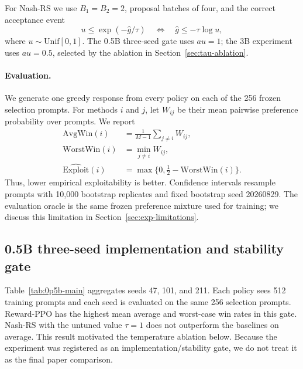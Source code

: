 For Nash-RS we use $B_1=B_2=2$, proposal batches of four, and the correct
acceptance event
\begin{equation}
  u \leq \exp\!\left(-\widehat g/\tau\right)
  \quad\Longleftrightarrow\quad
  \widehat g \leq -\tau\log u,
\end{equation}
where $u\sim\mathrm{Unif}[0,1]$.  The 0.5B three-seed gate uses $	au=1$;
the 3B experiment uses $	au=0.5$, selected by the ablation in
Section~\ref{sec:tau-ablation}.

\paragraph{Evaluation.}
We generate one greedy response from every policy on each of the 256 frozen
selection prompts.  For methods $i$ and $j$, let
$W_{ij}$ be their mean pairwise preference probability over prompts.  We report
\begin{align}
  \mathrm{AvgWin}(i) &= \frac{1}{M-1}\sum_{j\ne i} W_{ij}, \\
  \mathrm{WorstWin}(i) &= \min_{j\ne i} W_{ij}, \\
  \widehat{\mathrm{Exploit}}(i) &=
    \max\{0,\tfrac12-\mathrm{WorstWin}(i)\}.
\end{align}
Thus, lower empirical exploitability is better.  Confidence intervals resample
prompts with 10,000 bootstrap replicates and fixed bootstrap seed 20260829.
The evaluation oracle is the same frozen preference mixture used for training;
we discuss this limitation in Section~\ref{sec:exp-limitations}.

\subsection{0.5B three-seed implementation and stability gate}
\label{sec:0p5b-gate}

Table~\ref{tab:0p5b-main} aggregates seeds 47, 101, and 211.  Each policy sees
512 training prompts and each seed is evaluated on the same 256 selection
prompts.  Reward-PPO has the highest mean average and worst-case win rates in
this gate.  Nash-RS with the untuned value $\tau=1$ does not outperform the
baselines on average.  This result motivated the temperature ablation below.
Because the experiment was registered as an implementation/stability gate,
we do not treat it as the final paper comparison.

